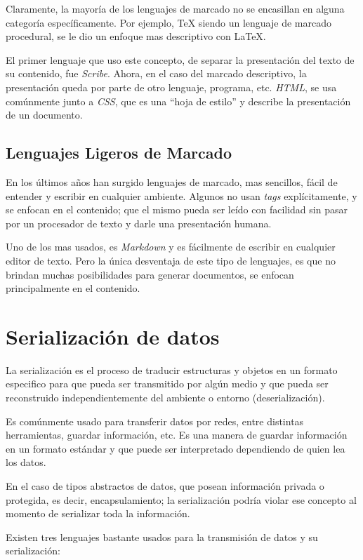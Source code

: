 \documentclass[12pt,letterpaper,titlepage,oneside,openright]{book}
\newcommand{\latex}{\LaTeX\xspace}
\newcommand{\tex}{\TeX\xspace}
\begin{document}
Claramente, la mayoría de los lenguajes de marcado no se encasillan en alguna categoría específicamente. Por ejemplo, \tex siendo un lenguaje de marcado procedural, se le dio un enfoque mas descriptivo con \latex.

El primer lenguaje que uso este concepto, de separar la presentación del texto de su contenido, fue \textit{Scribe}. Ahora, en el caso del marcado descriptivo, la presentación queda por parte de otro lenguaje, programa, etc. \textit{HTML}, se usa comúnmente junto a \textit{CSS}, que es una ``hoja de estilo'' y describe la presentación de un documento.

\subsection{Lenguajes Ligeros de Marcado}

En los últimos años han surgido lenguajes de marcado, mas sencillos, fácil de entender y escribir en cualquier ambiente.  Algunos no usan \textit{tags} explícitamente, y se enfocan en el contenido; que el mismo pueda ser leído con facilidad sin pasar por un procesador de texto y darle una presentación humana.

Uno de los mas usados, es \textit{Markdown} y es fácilmente de escribir en cualquier editor de texto. Pero la única desventaja de este tipo de lenguajes, es que no brindan muchas posibilidades para generar documentos, se enfocan principalmente en el contenido.

\section{Serialización de datos}

La serialización es el proceso de traducir estructuras y objetos en un formato especifico para que pueda ser transmitido por algún medio y que pueda ser reconstruido independientemente del ambiente o entorno (deserialización).

Es comúnmente usado para transferir datos por redes, entre distintas herramientas, guardar información, etc. Es una manera de guardar información en un formato estándar y que puede ser interpretado dependiendo de quien lea los datos.

En el caso de tipos abstractos de datos, que posean información privada o protegida, es decir, encapsulamiento; la serialización podría violar ese concepto al momento de serializar toda la información.

Existen tres lenguajes bastante usados para la transmisión de datos y su serialización:
\end{document}

